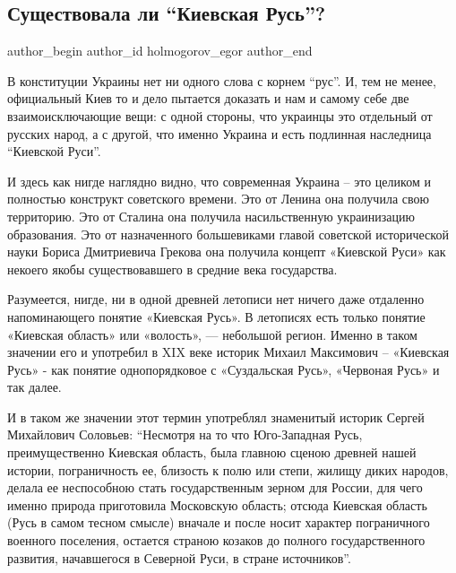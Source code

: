  
 
 
 
 
 
\subsection{Существовала ли \enquote{Киевская Русь}?}
\label{sec:17_02_2022.yz.holmogorov_egor.1.kievrus}
 
\ifcmt
 author_begin
   author_id holmogorov_egor
 author_end
\fi

В конституции Украины нет ни одного слова с корнем \enquote{рус}. И, тем не
менее, официальный Киев то и дело пытается доказать и нам и самому себе две
взаимоисключающие вещи: с одной стороны, что украинцы это отдельный от русских
народ, а с другой, что именно Украина и есть подлинная наследница
\enquote{Киевской Руси}.

И здесь как нигде наглядно видно, что современная Украина – это целиком и
полностью конструкт советского времени. Это от Ленина она получила свою
территорию. Это от Сталина она получила насильственную украинизацию
образования. Это от назначенного большевиками главой советской исторической
науки Бориса Дмитриевича Грекова она получила концепт «Киевской Руси» как
некоего якобы существовавшего в средние века государства.


Разумеется, нигде, ни в одной древней летописи нет ничего даже отдаленно
напоминающего понятие «Киевская Русь». В летописях есть только понятие
«Киевская область» или «волость», — небольшой регион. Именно в таком значении
его и употребил в XIX веке историк Михаил Максимович – «Киевская Русь» - как
понятие однопорядковое с «Суздальская Русь», «Червоная Русь» и так далее. 


И в таком же значении этот термин употреблял знаменитый историк Сергей
Михайлович Соловьев: \enquote{Несмотря на то что Юго-Западная Русь, преимущественно
Киевская область, была главною сценою древней нашей истории, пограничность ее,
близость к полю или степи, жилищу диких народов, делала ее неспособною стать
государственным зерном для России, для чего именно природа приготовила
Московскую область; отсюда Киевская область (Русь в самом тесном смысле)
вначале и после носит характер пограничного военного поселения, остается
страною козаков до полного государственного развития, начавшегося в Северной
Руси, в стране источников}.


